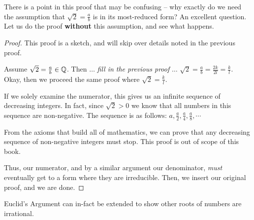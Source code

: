 \documentclass[main.tex]{subfiles}
\begin{document}
There is a point in this proof that may be confusing -- why exactly do we need the assumption that \(\sqrt{2} = \frac{a}{b}\) is in its most-reduced form? An excellent question. Let us do the proof \textbf{without} this assumption, and see what happens.

\begin{proof}
	This proof is a sketch, and will skip over details noted in the previous proof.
	
	Assume \(\sqrt{2} = \frac{a}{b} \in \mathbb{Q}\). Then \(\dots\) \textit{fill in the previous proof} \(\dots\) \(\sqrt{2} = \frac{a}{b} = \frac{2k}{2l} = \frac{k}{l}\). Okay, then we proceed the same proof where \(\sqrt{2} = \frac{k}{l}\).
	
	If we solely examine the numerator, this gives us an infinite sequence of decreasing integers. In fact, since \(\sqrt{2} > 0\) we know that all numbers in this sequence are non-negative. The sequence is as follows: \(a, \frac{a}{2}, \frac{a}{4}, \frac{a}{8}, \cdots\)
	
	From the axioms that build all of mathematics, we can prove that any decreasing sequence of non-negative integers must stop. This proof is out of scope of this book.
	
	Thus, our numerator, and by a similar argument our denominator, \textit{must} eventually get to a form where they are irreducible. Then, we insert our original proof, and we are done.
\end{proof}

Euclid's Argument can in-fact be extended to show other roots of numbers are irrational.

\end{document}

